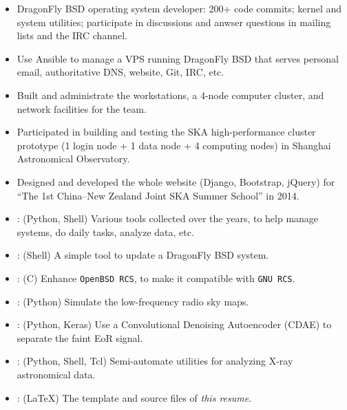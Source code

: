 \documentclass{resume}
\begin{document}
\begin{itemize}
  \item DragonFly BSD operating system developer:
    200+ code commits; kernel and system utilities;
    participate in discussions and anwser questions
    in mailing lists and the IRC channel.
  \item Use Ansible to manage a VPS running DragonFly BSD that serves
    personal email, authoritative DNS, website, Git, IRC, etc.
  \item Built and administrate the workstations, a 4-node computer cluster,
    and network facilities for the team.
  \item Participated in building and testing the SKA high-performance
    cluster prototype (1 login node + 1 data node + 4 computing nodes)
    in Shanghai Astronomical Observatory.
  \item Designed and developed the whole website (Django, Bootstrap, jQuery)
    for \enquote{The 1st China--New Zealand Joint SKA Summer School}
    in 2014.
\end{itemize}

\begin{itemize}
  \item {}:
    (Python, Shell)
    Various tools collected over the years, to help manage systems,
    do daily tasks, analyze data, etc.
  \item {}:
    (Shell)
    A simple tool to update a DragonFly BSD system.
  \item {}:
    (C)
    Enhance \texttt{OpenBSD RCS}, to make it compatible with \texttt{GNU RCS}.
  \item {}:
    (Python)
    Simulate the low-frequency radio sky maps.
  \item {}:
    (Python, Keras)
    Use a Convolutional Denoising Autoencoder (CDAE) to separate the
    faint EoR signal.
  \item {}:
    (Python, Shell, Tcl)
    Semi-automate utilities for analyzing X-ray astronomical data.
  \item {}:
    (\LaTeX)
    The template and source files of \emph{this resume}.
\end{itemize}
\end{document}
